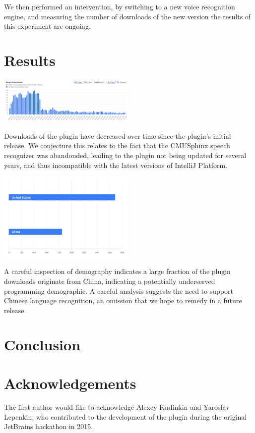 \documentclass[conference]{IEEEtran}
\begin{document}
We then performed an intervention, by switching to a new voice recognition engine, and measuring the number of downloads of the new version the results of this experiment are ongoing.

\section{Results}

\includegraphics[width=0.50\textwidth]{downloads.png}

Downloads of the plugin have decreased over time since the plugin's initial release. We conjecture this relates to the fact that the CMUSphinx speech recognizer was abandonded, leading to the plugin not being updated for several years, and thus incompatible with the latest versions of IntelliJ Platform.

\includegraphics[width=0.50\textwidth]{demographics.png}

A careful inspection of demography indicates a large fraction of the plugin downloads originate from China, indicating a potentially underserved programming demographic. A careful analysis suggests the need to support Chinese language recognition, an omission that we hope to remedy in a future release.

\section{Conclusion}

\section{Acknowledgements}

The first author would like to acknowledge Alexey Kudinkin and Yaroslav Lepenkin, who contributed to the development of the plugin during the original JetBrains hackathon in 2015.
\end{document}
